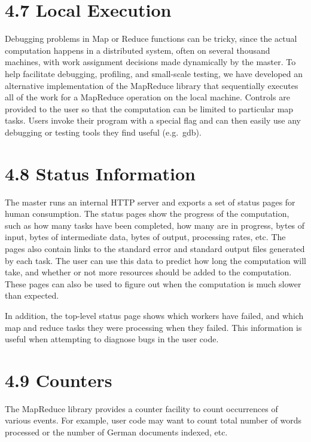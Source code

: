 \documentclass[
]{article}
\begin{document}
\section{4.7 Local Execution}\label{local-execution}

Debugging problems in Map or Reduce functions can be tricky, since the
actual computation happens in a distributed system, often on several
thousand machines, with work assignment decisions made dynamically by
the master. To help facilitate debugging, profiling, and small-scale
testing, we have developed an alternative implementation of the
MapReduce library that sequentially executes all of the work for a
MapReduce operation on the local machine. Controls are provided to the
user so that the computation can be limited to particular map tasks.
Users invoke their program with a special flag and can then easily use
any debugging or testing tools they find useful (e.g.~gdb).

\section{4.8 Status Information}\label{status-information}

The master runs an internal HTTP server and exports a set of status
pages for human consumption. The status pages show the progress of the
computation, such as how many tasks have been completed, how many are in
progress, bytes of input, bytes of intermediate data, bytes of output,
processing rates, etc. The pages also contain links to the standard
error and standard output files generated by each task. The user can use
this data to predict how long the computation will take, and whether or
not more resources should be added to the computation. These pages can
also be used to figure out when the computation is much slower than
expected.

In addition, the top-level status page shows which workers have failed,
and which map and reduce tasks they were processing when they failed.
This information is useful when attempting to diagnose bugs in the user
code.

\section{4.9 Counters}\label{counters}

The MapReduce library provides a counter facility to count occurrences
of various events. For example, user code may want to count total number
of words processed or the number of German documents indexed, etc.
\end{document}
